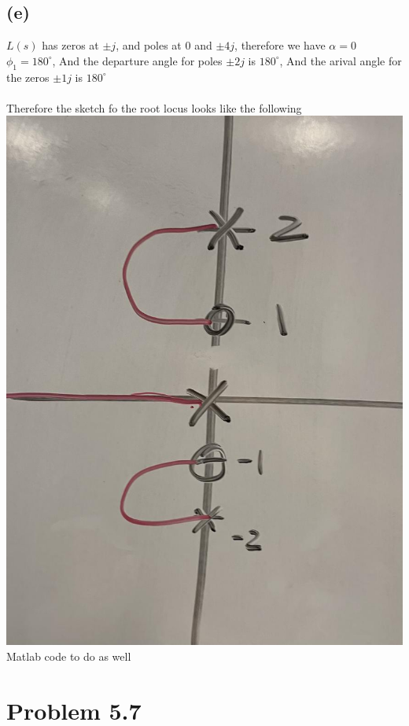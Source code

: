 \documentclass[12pt]{article}
\begin{document}
\subsection*{(e)}
$L(s)$ has zeros at $\pm j$, and poles at $0$ and $\pm4j$, therefore we have $\alpha=0$
$\phi_{1}=180^{\circ}$, 
And the departure angle for poles $\pm2j$ is $180^{\circ}$, And the arival angle for the zeros $\pm1j$ is $180^{\circ}$\\\\
Therefore the sketch fo the root locus looks like the following
\\
\includegraphics[scale=.15]{Problem1Sketch2.jpg}
\\
Matlab code to do as well
\section*{Problem 5.7}
\end{document}
